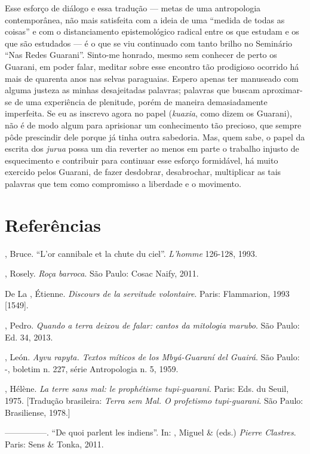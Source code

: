 {{Esse esforço de diálogo e essa tradução --- metas de uma antropologia
contemporânea, não mais satisfeita com a ideia de uma ``medida de todas
as coisas'' e com o distanciamento epistemológico radical entre os que
estudam e os que são estudados --- é o que se viu continuado com tanto
brilho no Seminário ``Nas Redes Guarani''. Sinto-me honrado, mesmo sem
conhecer de perto os Guarani, em poder falar, meditar sobre esse
encontro tão prodigioso ocorrido há mais de quarenta anos nas selvas
paraguaias. Espero apenas ter manuseado com alguma justeza as minhas
desajeitadas palavras; palavras que buscam aproximar-se de uma
experiência de plenitude, porém de maneira demasiadamente imperfeita.
Se eu as inscrevo agora no papel (\emph{kuaxia}, como dizem os Guarani), não é
de modo algum para aprisionar um conhecimento tão precioso, que sempre
pôde prescindir dele porque já tinha outra sabedoria. Mas, quem sabe, o
papel da escrita dos \emph{jurua} possa um dia reverter ao menos em parte o
trabalho injusto de esquecimento e contribuir para continuar esse
esforço formidável, há muito exercido pelos Guarani, de fazer
desdobrar, desabrochar, multiplicar as tais palavras que tem como
compromisso a liberdade e o movimento.

\section{Referências}

\begin{Parskip}
, Bruce. ``L’or cannibale et la chute du ciel''. \emph{L’homme} 126-128,
1993.

 , Rosely. \emph{Roça barroca}. São Paulo: Cosac Naify, 2011.

De La , Étienne. \emph{Discours de la servitude volontaire}. Paris:
Flammarion, 1993 [1549].

, Pedro. \emph{Quando a terra deixou de falar: cantos da mitologia
marubo}. São Paulo: Ed. 34, 2013.

, León. \emph{Ayvu rapyta. Textos míticos de los Mbyá-Guaraní del
Guairá}. São Paulo: -, boletim n. 227, série Antropologia n. 5,
1959.

, Hélène. \emph{La terre sans mal: le prophétisme tupi-guarani}. Paris:
Eds. du Seuil, 1975. [Tradução brasileira: \emph{Terra sem Mal. O profetismo
tupi-guarani}. São Paulo: Brasiliense, 1978.]

—————. ``De quoi parlent les indiens''. In: , Miguel \& 
(eds.) \emph{Pierre Clastres}. Paris: Sens \& Tonka, 2011.


\end{Parskip}}}
